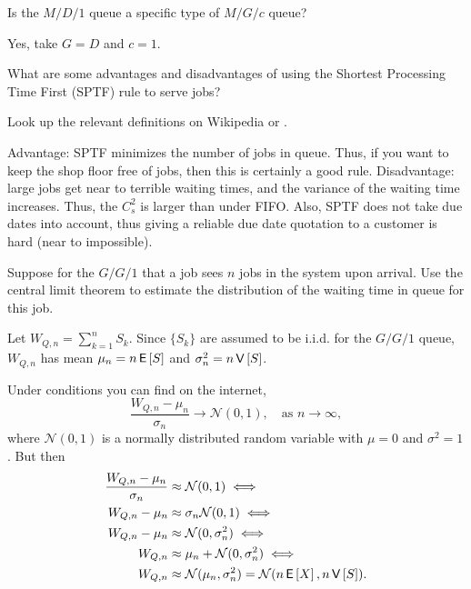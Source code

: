 \begin{exercise}
  Is the $M/D/1$ queue a specific type of  $M/G/c$ queue? 
\begin{solution}
    Yes, take $G=D$ and $c=1$. 
\end{solution}
\end{exercise}

\begin{exercise}
  What are some advantages and disadvantages of using the Shortest Processing Time First (SPTF) rule to serve jobs?
\begin{hint}
Look up the relevant
  definitions on Wikipedia or
  \citet{hall91:_queuein_method_servic_manuf}.
\end{hint}
\begin{solution}
    Advantage: SPTF minimizes the number of jobs in queue.
    Thus, if you want to keep the shop floor free of jobs, then this is certainly a good rule.
    Disadvantage: large jobs get near to terrible waiting times, and the variance of the waiting time increases.
    Thus, the $C_s^2$ is larger than under FIFO.
    Also, SPTF does not take due dates into account, thus giving a reliable due date quotation to a customer is hard (near to impossible).
\end{solution}
\end{exercise}


\begin{exercise}
  Suppose for the $G/G/1$ that a job sees $n$ jobs in the system upon arrival.
  Use the central limit theorem to estimate the distribution of the waiting time in queue for this job.
\begin{hint}
    Let $W_{Q,n} = \sum_{k=1}^n S_k$.
    Since $\{S_k\}$ are assumed to be i.i.d.
    for the $G/G/1$ queue,  $W_{Q,n}$ has mean $\mu_n = n \,\mathsf{E}\left[S\right]$ and $\sigma_n^2 = n\,\mathsf{V}\left[S\right]$.
\end{hint}
\begin{solution} Under conditions you can find on the internet,
    \begin{equation*}
    \frac{W_{Q,n} - \mu_n}{\sigma_n} \to \mathcal{N}(0,1), \quad\text{as } n\to \infty,
    \end{equation*}
    where $\mathcal{N}(0,1)$ is a normally distributed random variable
    with $\mu=0$ and $\sigma^2=1$. But then 
    \begin{align*}
    \frac{W_{Q,n} - \mu_n}{\sigma_n} &\approx  \mathcal{N}(0,1)  \iff\\
    W_{Q,n} - \mu_n &\approx  \sigma_n \mathcal{N}(0,1)  \iff\\
    W_{Q,n} - \mu_n &\approx  \mathcal{N}(0,\sigma_n^2)  \iff\\
    W_{Q,n}  &\approx   \mu_n  + \mathcal{N}(0,\sigma_n^2)  \iff\\
    W_{Q,n}  &\approx    \mathcal{N}(\mu_n,\sigma_n^2) = \mathcal{N}(n\,\mathsf{E}\left[X\right], n \,\mathsf{V}\left[S\right]).
    \end{align*}
\end{solution}
\end{exercise}


